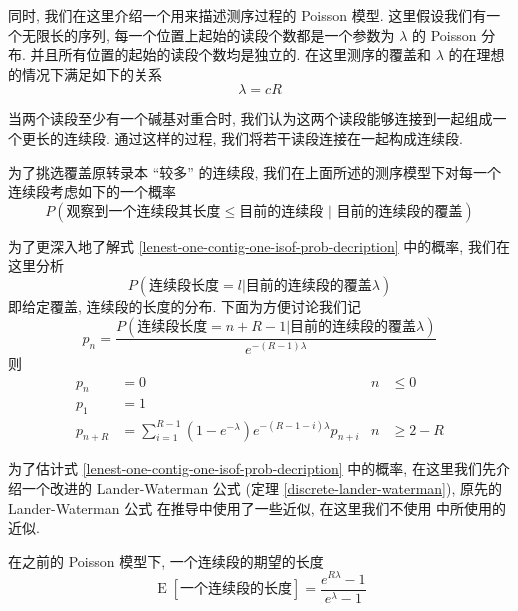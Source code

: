 同时, 我们在这里介绍一个用来描述测序过程的 Poisson 模型. 
这里假设我们有一个无限长的序列, 
每一个位置上起始的读段个数都是一个参数为 $\lambda$ 的 Poisson 分布. 
并且所有位置的起始的读段个数均是独立的. 
在这里测序的覆盖和 $\lambda$ 的在理想的情况下满足如下的关系
\[
\lambda = c R
\]

当两个读段至少有一个碱基对重合时, 
我们认为这两个读段能够连接到一起组成一个更长的连续段. 通过这样的过程, 
我们将若干读段连接在一起构成连续段. 

为了挑选覆盖原转录本 ``较多'' 的连续段, 
我们在上面所述的测序模型下对每一个连续段考虑如下的一个概率
\begin{equation}
\label{lenest-one-contig-one-isof-prob-decription}
P(\text{观察到一个连续段其长度} \leq \text{目前的连续段 } |\text{ 目前的连续段的覆盖})
\end{equation}

为了更深入地了解式 \eqref{lenest-one-contig-one-isof-prob-decription} 中的概率, 
我们在这里分析
\begin{equation}
\label{lenest-one-cont-prob-distr}
P(\text{连续段长度} = l | \text{目前的连续段的覆盖} \lambda)
\end{equation}
即给定覆盖, 连续段的长度的分布. 
下面为方便讨论我们记
\begin{equation}
p_n =  \frac{P(\text{连续段长度} = n+R-1 | \text{目前的连续段的覆盖} \lambda)}{e^{-(R-1)\lambda}}
\end{equation}
则
\begin{align}
p_n &= 0 & n &\leq 0 \\
p_1 &= 1 & & \\
p_{n+R} &= \sum_{i=1}^{R-1} (1-e^{-\lambda}) e^{-(R-1-i)\lambda} p_{n+i} & n &\geq 2-R
\end{align}

为了估计式 \eqref{lenest-one-contig-one-isof-prob-decription} 中的概率, 
在这里我们先介绍一个改进的 Lander-Waterman 公式 (定理 \ref{discrete-lander-waterman}), 
原先的 Lander-Waterman 公式 \cite{lander1988genomic} 在推导中使用了一些近似, 
在这里我们不使用  中所使用的近似. 

\begin{thm}
\label{discrete-lander-waterman-thm}
在之前的 Poisson 模型下, 一个连续段的期望的长度
\begin{equation}
\label{discrete-lander-waterman-formula}
\operatorname{E}[\text{一个连续段的长度}] = \frac{e^{R\lambda} - 1}{e^\lambda - 1} 
\end{equation}
\end{thm}

